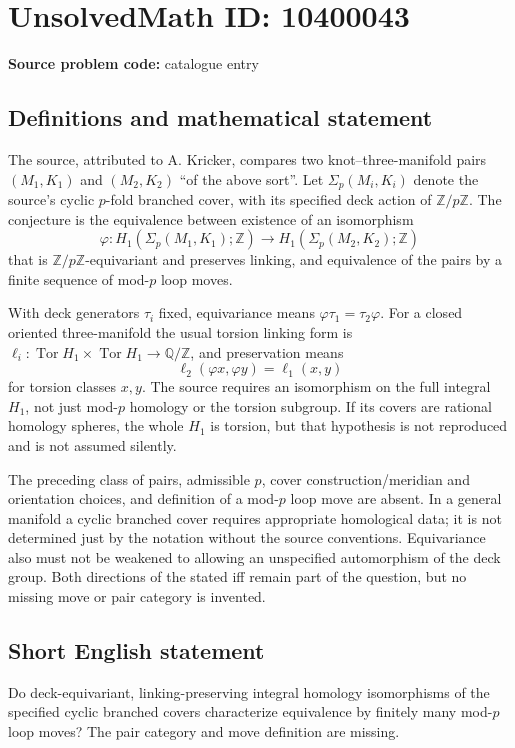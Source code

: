 \documentclass[11pt]{article}
\newcommand{\Z}{\mathbb{Z}}
\newcommand{\Q}{\mathbb{Q}}
\begin{document}
\section*{UnsolvedMath ID: 10400043}
\textbf{Source problem code:} catalogue entry
\subsection{Definitions and mathematical statement}
The source, attributed to A. Kricker, compares two knot--three-manifold pairs $(M_1,K_1)$ and $(M_2,K_2)$ ``of the above sort''. Let $\Sigma_p(M_i,K_i)$ denote the source's cyclic $p$-fold branched cover, with its specified deck action of $\Z/p\Z$. The conjecture is the equivalence between existence of an isomorphism
\[
\varphi:H_1(\Sigma_p(M_1,K_1);\Z)\longrightarrow
H_1(\Sigma_p(M_2,K_2);\Z)
\]
that is $\Z/p\Z$-equivariant and preserves linking, and equivalence of the pairs by a finite sequence of mod-$p$ loop moves.

With deck generators $\tau_i$ fixed, equivariance means $\varphi\tau_1=\tau_2\varphi$. For a closed oriented three-manifold the usual torsion linking form is $\ell_i:\operatorname{Tor}H_1\times\operatorname{Tor}H_1\to\Q/\Z$, and preservation means
\[
\ell_2(\varphi x,\varphi y)=\ell_1(x,y)
\]
for torsion classes $x,y$. The source requires an isomorphism on the full integral $H_1$, not just mod-$p$ homology or the torsion subgroup. If its covers are rational homology spheres, the whole $H_1$ is torsion, but that hypothesis is not reproduced and is not assumed silently.

The preceding class of pairs, admissible $p$, cover construction/meridian and orientation choices, and definition of a mod-$p$ loop move are absent. In a general manifold a cyclic branched cover requires appropriate homological data; it is not determined just by the notation without the source conventions. Equivariance also must not be weakened to allowing an unspecified automorphism of the deck group. Both directions of the stated iff remain part of the question, but no missing move or pair category is invented.
\subsection{Short English statement}
Do deck-equivariant, linking-preserving integral homology isomorphisms of the specified cyclic branched covers characterize equivalence by finitely many mod-$p$ loop moves? The pair category and move definition are missing.
\end{document}
